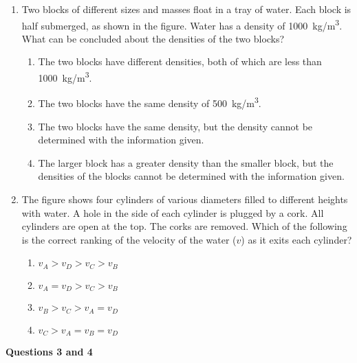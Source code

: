 \documentclass{../../oss-apphys}
\begin{document}
\genheader


\genmultidirections

\gengravity

\raggedcolumns
\begin{multicols}{2}

  \begin{enumerate}[leftmargin=18pt]

  \item Two blocks of different sizes and masses float in a tray of water. Each
    block is half submerged, as shown in the figure. Water has a density of
    \SI{1000}{kg/m^3}. What can be concluded about the densities of the two
    blocks?
    \begin{enumerate}[noitemsep,topsep=0pt,leftmargin=18pt,label=(\Alph*)]
    \item The two blocks have different densities, both of which are less than
      \SI{1000}{kg/m^3}.
    \item The two blocks have the same density of \SI{500}{kg/m^3}.
    \item The two blocks have the same density, but the density cannot be
      determined with the information given.
    \item The larger block has a greater density than the smaller block, but
      the densities of the blocks cannot be determined with the information
      given.
    \end{enumerate}

  \item The figure shows four cylinders of various diameters filled to different
    heights with water. A hole in the side of each cylinder is plugged by a
    cork. All cylinders are open at the top. The corks are removed. Which
    of the following is the correct ranking of the velocity of the water ($v$)
    as it exits each cylinder?
    \begin{enumerate}[noitemsep,topsep=0pt,leftmargin=18pt,label=(\Alph*)]
    \item $v_A > v_D > v_C > v_B$
    \item $v_A = v_D > v_C > v_B$
    \item $v_B > v_C > v_A = v_D$
    \item $v_C > v_A = v_B = v_D$
    \end{enumerate}
  \end{enumerate}
  
  \textbf{Questions 3 and 4}


\end{multicols}
\end{document}
